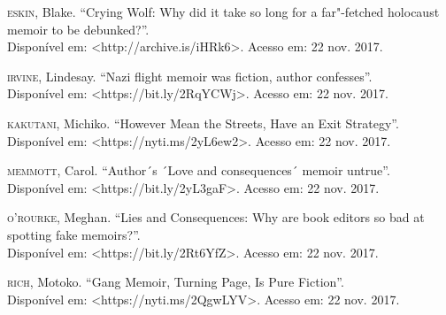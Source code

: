 \begin{hangparas}{.35in}{1}
\textsc{eskin}, Blake. ``Crying Wolf: Why did it take so long for a
far"-fetched holocaust memoir to be debunked?''.\\
Disponível em: \textless{}http://archive.is/iHRk6\textgreater{}. 
Acesso em: 22 nov. 2017.

\textsc{irvine}, Lindesay. ``Nazi flight memoir was fiction, author
confesses''. \\
Disponível em: \textless{}https://bit.ly/2RqYCWj\textgreater{}.
Acesso em: 22 nov. 2017.

\textsc{kakutani}, Michiko. ``However Mean the Streets, Have an Exit
Strategy''. \\
Disponível em: \textless{}https://nyti.ms/2yL6ew2\textgreater{}.
Acesso em: 22 nov. 2017.

\textsc{memmott}, Carol. ``Author´s ´Love and consequences´ memoir
untrue''. \\
Disponível em: \textless{}https://bit.ly/2yL3gaF\textgreater{}.
Acesso em: 22 nov. 2017.

\textsc{o'rourke}, Meghan. ``Lies and Consequences: Why are book editors
so bad at spotting fake memoirs?''. \\
Disponível em: \textless{}https://bit.ly/2Rt6YfZ\textgreater{}.
Acesso em: 22 nov. 2017.

\textsc{rich}, Motoko. ``Gang Memoir, Turning Page, Is Pure Fiction''.\\
Disponível em: \textless{}https://nyti.ms/2QgwLYV\textgreater{}.
Acesso em: 22 nov. 2017.
\end{hangparas}

